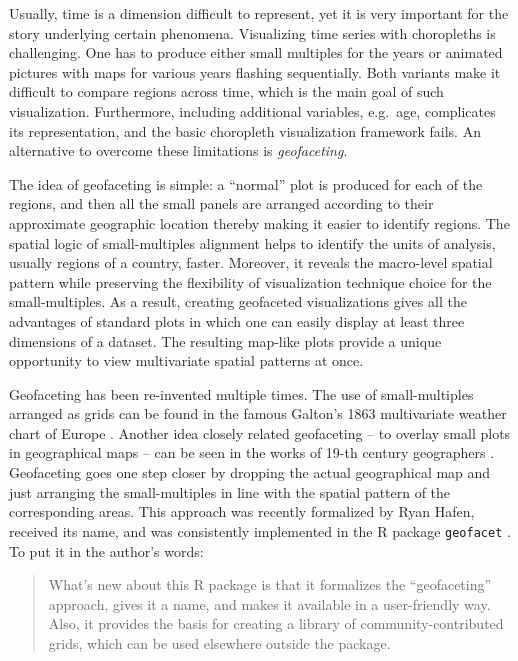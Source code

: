 \documentclass[10pt, twoside, parskip=half]{article}
\begin{document}
Usually, time is a dimension difficult to represent, yet it is very important for the story underlying certain phenomena. Visualizing time series with choropleths is challenging. One has to produce either small multiples for the years or animated pictures with maps for various years flashing sequentially. Both variants make it difficult to compare regions across time, which is the main goal of such visualization. Furthermore, including additional variables, e.g.~age, complicates its representation, and the basic choropleth visualization framework fails. An alternative to overcome these limitations is \emph{geofaceting}.

The idea of geofaceting is simple: a ``normal'' plot is produced for each of the regions, and then all the small panels are arranged according to their approximate geographic location thereby making it easier to identify regions. The spatial logic of small-multiples alignment helps to identify the units of analysis, usually regions of a country, faster. Moreover, it reveals the macro-level spatial pattern while preserving the flexibility of visualization technique choice for the small-multiples. As a result, creating geofaceted visualizations gives all the advantages of standard plots in which one can easily display at least three dimensions of a dataset. The resulting map-like plots provide a unique opportunity to view multivariate spatial patterns at once.

Geofaceting has been re-invented multiple times. The use of small-multiples arranged as grids can be found in the famous Galton's 1863 multivariate weather chart of Europe \citep{galton1863, friendly2008hodv}. Another idea closely related geofaceting -- to overlay small plots in geographical maps -- can be seen in the works of 19-th century geographers \citep{palsky1996}. Geofaceting goes one step closer by dropping the actual geographical map and just arranging the small-multiples in line with the spatial pattern of the corresponding areas. This approach was recently formalized by Ryan Hafen, received its name, and was consistently implemented in the R package \texttt{geofacet} \citep{hafen2019}. To put it in the author's words:

\begin{quote}
What's new about this R package is that it formalizes the ``geofaceting'' approach, gives it a name, and makes it available in a user-friendly way. Also, it provides the basis for creating a library of community-contributed grids, which can be used elsewhere outside the package. \citep{hafen2018rh}
\end{quote}
\end{document}
